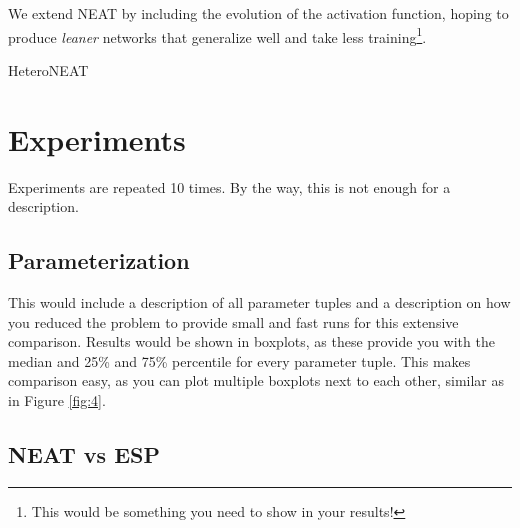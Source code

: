 \documentclass{hbrs-ecta-report}
\begin{document}
We extend NEAT by including the evolution of the activation function, hoping to produce \textit{leaner} networks that generalize well and take less training\footnote{This would be something you need to show in your results!}. 

\begin{algorithm}[ht!]
\caption{HeteroNEAT}
\label{alg:heteroneat}
\begin{algorithmic}[1]
\State  $c$: $\leftarrow$ mutRate, crossRate, numSpecies, actFcns /* Configuration */
\Statex Input: evalFcn
\State $P$: $\leftarrow$ \textbf{\textit{initPop($n$)}} minimal networks
	\State $N$: $\leftarrow$ expressNetwork($P$)
	\State $F$: $\leftarrow$ evalFcn($N$)
	\State $P$: $\leftarrow$ $(P,N,F)$	/* Assign fitness /*
	\State $S$: $\leftarrow$ speciate($P$,$c$)
	\For{species $s$ in $S$)
		\State $s'(1)$ $\leftarrow$ getElite($s$)
		\State cull($s$,$c$) /* If species is large enough */
		\State $p$: $\leftarrow$ tournamentSelect($s$)
		\State crossover($p$,$c$) /* Combine matching connections */
		\State \textbf{\textit{mutate($p$,$c$)}}
	\EndFor
\EndFor
\EndFunction
\end{algorithmic}
\end{algorithm}

\FloatBarrier
\section{Experiments}
Experiments are repeated 10 times. By the way, this is not enough for a description.

\subsection{Parameterization}
This would include a description of all parameter tuples and a description on how you reduced the problem to provide small and fast runs for this extensive comparison. Results would be shown in boxplots, as these provide you with the median and 25\% and 75\% percentile for every parameter tuple. This makes comparison easy, as you can plot multiple boxplots next to each other, similar as in Figure \ref{fig:4}.

\subsection{NEAT vs ESP}
\end{document}
